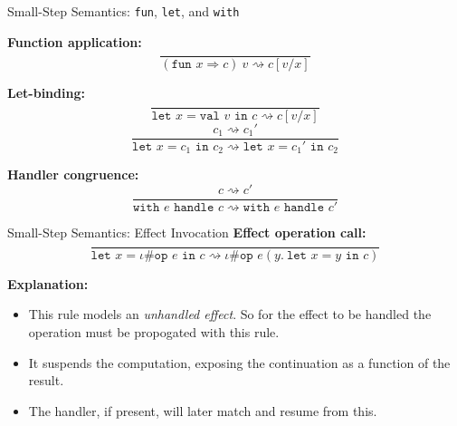 \begin{frame}{Small-Step Semantics: \texttt{fun}, \texttt{let}, and \texttt{with}}

\textbf{Function application:}
\[
\frac{}{(\texttt{fun } x \Rightarrow c)\ v \rightsquigarrow c[v/x]}
\]

\vspace{1em}
\textbf{Let-binding:}
\[
\frac{}{ \texttt{let } x = \texttt{val } v \texttt{ in } c \rightsquigarrow c[v/x] }
\]
\[
\frac{c_1 \rightsquigarrow c_1'}{\texttt{let } x = c_1 \texttt{ in } c_2 \rightsquigarrow \texttt{let } x = c_1' \texttt{ in } c_2}
\]

\vspace{1em}
\textbf{Handler congruence:}
\[
\frac{c \rightsquigarrow c'}{\texttt{with } e \texttt{ handle } c \rightsquigarrow \texttt{with } e \texttt{ handle } c'}
\]

\end{frame}

\begin{frame}{Small-Step Semantics: Effect Invocation}
\textbf{Effect operation call:}
\[
\frac{}{
  \texttt{let } x = \iota \# \texttt{op } e \texttt{ in } c
  \rightsquigarrow
  \iota \# \texttt{op } e (y.\ \texttt{let } x = y \texttt{ in } c)
}
\]

\vspace{1.5em}
\textbf{Explanation:}
\pause
\begin{itemize}
  \item This rule models an \emph{unhandled effect}. So for the effect to be handled the operation must be propogated with this rule.
  \item It suspends the computation, exposing the continuation as a function of the result.
  \item The handler, if present, will later match and resume from this.
\end{itemize}
\end{frame}



